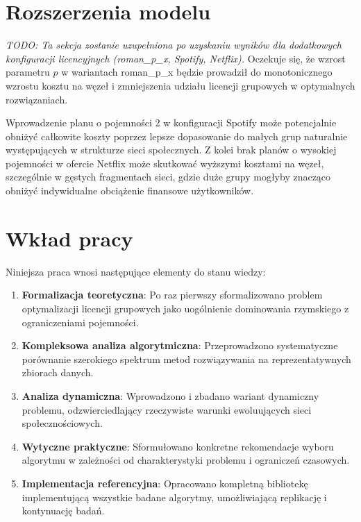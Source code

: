 \section{Rozszerzenia modelu}

\emph{TODO: Ta sekcja zostanie uzupełniona po uzyskaniu wyników dla dodatkowych konfiguracji licencyjnych (roman\_p\_x, Spotify, Netflix).} Oczekuje się, że wzrost parametru $p$ w wariantach roman\_p\_x będzie prowadził do monotonicznego wzrostu kosztu na węzeł i zmniejszenia udziału licencji grupowych w optymalnych rozwiązaniach.

Wprowadzenie planu o pojemności 2 w konfiguracji Spotify może potencjalnie obniżyć całkowite koszty poprzez lepsze dopasowanie do małych grup naturalnie występujących w strukturze sieci społecznych. Z kolei brak planów o wysokiej pojemności w ofercie Netflix może skutkować wyższymi kosztami na węzeł, szczególnie w gęstych fragmentach sieci, gdzie duże grupy mogłyby znacząco obniżyć indywidualne obciążenie finansowe użytkowników.

\section{Wkład pracy}

Niniejsza praca wnosi następujące elementy do stanu wiedzy:

\begin{enumerate}
\item \textbf{Formalizacja teoretyczna}: Po raz pierwszy sformalizowano problem optymalizacji licencji grupowych jako uogólnienie dominowania rzymskiego z ograniczeniami pojemności.

\item \textbf{Kompleksowa analiza algorytmiczna}: Przeprowadzono systematyczne porównanie szerokiego spektrum metod rozwiązywania na reprezentatywnych zbiorach danych.

\item \textbf{Analiza dynamiczna}: Wprowadzono i zbadano wariant dynamiczny problemu, odzwierciedlający rzeczywiste warunki ewoluujących sieci społecznościowych.

\item \textbf{Wytyczne praktyczne}: Sformułowano konkretne rekomendacje wyboru algorytmu w zależności od charakterystyki problemu i ograniczeń czasowych.

\item \textbf{Implementacja referencyjna}: Opracowano kompletną bibliotekę implementującą wszystkie badane algorytmy, umożliwiającą replikację i kontynuację badań.
\end{enumerate}

